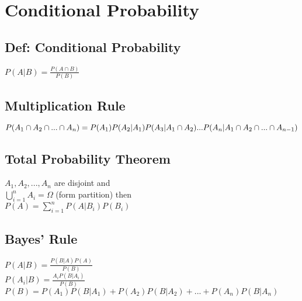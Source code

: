 \section{Conditional Probability}
    \subsection*{Def: Conditional Probability}
        $P(A|B) = \frac{P(A \cap B)}{P(B)}$
    
    \subsection*{Multiplication Rule}
        $P(A_1 \cap A_2 \cap ... \cap A_n) = P(A_1)P(A_2|A_1)\\P(A_3|A_1 \cap A_2)...P(A_n|A_1 \cap A_2 \cap ... \cap A_{n-1})$

    \subsection*{Total Probability Theorem}
        $A_1, A_2, ... , A_n$ are disjoint and\\
        $\bigcup_{i=1}^{n} A_i = \Omega$ (form partition) then\\
        $P(A) = \sum_{i=1}^{n} P(A|B_i)P(B_i)$

    \subsection*{Bayes' Rule}
        $P(A|B) = \frac{P(B|A)P(A)}{P(B)}$\\
        $P(A_i|B) = \frac{A_iP(B|A_i)}{P(B)}$\\
        $P(B) = P(A_1)P(B|A_1)+P(A_2)P(B|A_2)+...+P(A_n)P(B|A_n)$
        